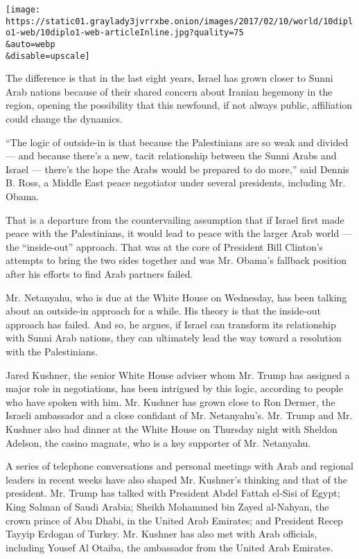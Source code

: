 \texttt{[image: https://static01.graylady3jvrrxbe.onion/images/2017/02/10/world/10diplo1-web/10diplo1-web-articleInline.jpg?quality=75\\\&auto=webp\\\&disable=upscale]}

The difference is that in the last eight years, Israel has grown closer
to Sunni Arab nations because of their shared concern about Iranian
hegemony in the region, opening the possibility that this newfound, if
not always public, affiliation could change the dynamics.

``The logic of outside-in is that because the Palestinians are so weak
and divided --- and because there's a new, tacit relationship between
the Sunni Arabs and Israel --- there's the hope the Arabs would be
prepared to do more,'' said Dennis B. Ross, a Middle East peace
negotiator under several presidents, including Mr. Obama.

That is a departure from the countervailing assumption that if Israel
first made peace with the Palestinians, it would lead to peace with the
larger Arab world --- the ``inside-out'' approach. That was at the core
of President Bill Clinton's attempts to bring the two sides together and
was Mr. Obama's fallback position after his efforts to find Arab
partners failed.

Mr. Netanyahu, who is due at the White House on Wednesday, has been
talking about an outside-in approach for a while. His theory is that the
inside-out approach has failed. And so, he argues, if Israel can
transform its relationship with Sunni Arab nations, they can ultimately
lead the way toward a resolution with the Palestinians.

Jared Kushner, the senior White House adviser whom Mr. Trump has
assigned a major role in negotiations, has been intrigued by this logic,
according to people who have spoken with him. Mr. Kushner has grown
close to Ron Dermer, the Israeli ambassador and a close confidant of Mr.
Netanyahu's. Mr. Trump and Mr. Kushner also had dinner at the White
House on Thursday night with Sheldon Adelson, the casino magnate, who is
a key supporter of Mr. Netanyahu.

A series of telephone conversations and personal meetings with Arab and
regional leaders in recent weeks have also shaped Mr. Kushner's thinking
and that of the president. Mr. Trump has talked with President Abdel
Fattah el-Sisi of Egypt; King Salman of Saudi Arabia; Sheikh Mohammed
bin Zayed al-Nahyan, the crown prince of Abu Dhabi, in the United Arab
Emirates; and President Recep Tayyip Erdogan of Turkey. Mr. Kushner has
also met with Arab officials, including Yousef Al Otaiba, the ambassador
from the United Arab Emirates.

